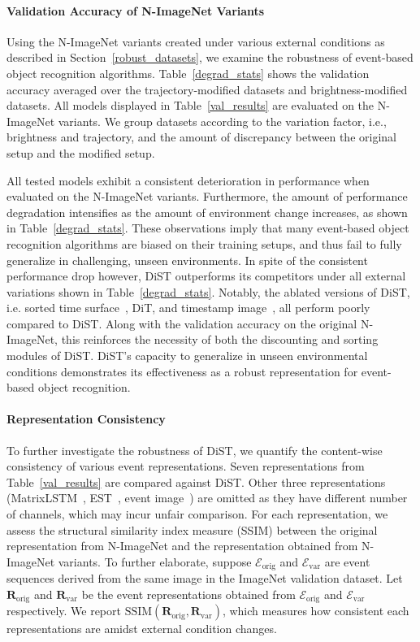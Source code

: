 \paragraph{\textbf{Validation Accuracy of N-ImageNet Variants}} 
Using the N-ImageNet variants created under various external conditions as described in Section~\ref{robust_datasets}, we examine the robustness of event-based object recognition algorithms.
Table~\ref{degrad_stats} shows the validation accuracy averaged over the trajectory-modified datasets and brightness-modified datasets.
All models displayed in Table~\ref{val_results} are evaluated on the N-ImageNet variants.
We group datasets according to the variation factor, i.e., brightness and trajectory, and the amount of discrepancy between the original setup and the modified setup.

All tested models exhibit a consistent deterioration in performance when evaluated on the N-ImageNet variants.
Furthermore, the amount of performance degradation intensifies as the amount of environment change increases, as shown in Table~\ref{degrad_stats}.
These observations imply that many event-based object recognition algorithms are biased on their training setups, and thus fail to fully generalize in challenging, unseen environments.
In spite of the consistent performance drop however, DiST outperforms its competitors under all external variations shown in Table~\ref{degrad_stats}.
Notably, the ablated versions of DiST, i.e. sorted time surface~\cite{ace}, DiT, and timestamp image~\cite{timestamp_image}, all perform poorly compared to DiST.
Along with the validation accuracy on the original N-ImageNet, this reinforces the necessity of both the discounting and sorting modules of DiST.
DiST's capacity to generalize in unseen environmental conditions demonstrates its effectiveness as a robust representation for event-based object recognition.

\paragraph{\textbf{Representation Consistency}} To further investigate the robustness of DiST, we quantify the content-wise consistency of various event representations.
Seven representations from Table~\ref{val_results} are compared against DiST.
Other three representations (MatrixLSTM~\cite{matrix_lstm}, EST~\cite{est}, event image~\cite{ev_gait}) are omitted as they have different number of channels, which may incur unfair comparison.
For each representation, we assess the structural similarity index measure (SSIM) between the original representation from N-ImageNet and the representation obtained from N-ImageNet variants.
To further elaborate, suppose $\mathcal{E}_\mathrm{orig}$ and $\mathcal{E}_\mathrm{var}$ are event sequences derived from the same image in the ImageNet validation dataset.
Let $\mathbf{R}_\mathrm{orig}$ and $\mathbf{R}_\mathrm{var}$ be the event representations obtained from $\mathcal{E}_\mathrm{orig}$ and $\mathcal{E}_\mathrm{var}$ respectively.
We report $\text{SSIM}(\mathbf{R}_\mathrm{orig}, \mathbf{R}_\mathrm{var})$, which measures how consistent each representations are amidst external condition changes.

